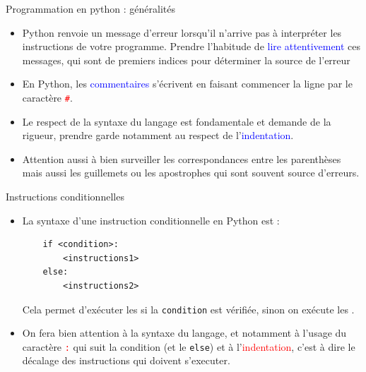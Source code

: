 \documentclass[10pt]{beamer}
\begin{document}
\begin{frame}[fragile]
	\mframe{\Python}
	\begin{block}{Programmation en python : généralités}
		\begin{itemize}
			\item<1-> Python renvoie un message d'erreur lorsqu'il n'arrive pas à interpréter les instructions de votre programme. Prendre l'habitude de \textcolor{blue}{lire attentivement} ces messages, qui sont de premiers indices pour déterminer la source de l'erreur
			\item<2-> En Python, les \textcolor{blue}{commentaires} s'écrivent en faisant commencer la ligne par le caractère \textcolor{red}{\tt \#}.
			\item<3-> Le respect de la syntaxe du langage est fondamentale et demande de la rigueur, prendre garde notamment au respect de l'\textcolor{blue}{indentation}.
			\item<4-> Attention aussi à bien surveiller les correspondances entre les parenthèses mais aussi les guillemets ou les apostrophes qui sont souvent source d'erreurs.
		\end{itemize}
	\end{block}
\end{frame}



\begin{frame}[fragile]
	\mframe{\Python}
	\begin{alertblock}{Instructions conditionnelles}
		\begin{itemize}
			\item<2-> La syntaxe d'une instruction conditionnelle en Python est :
			      \begin{lstlisting}
	if <condition>:
		<instructions1>
	else:
		<instructions2>
	\end{lstlisting}
			      Cela permet d'exécuter les {\tt <instructions1>} si la {\tt condition} est vérifiée, sinon on exécute les {\tt <instructions2>}.
			\item<3->  \textcolor{red}{\danger} On fera bien attention à la syntaxe du langage, et notamment à l'usage du caractère \textcolor{red}{\tt :} qui suit la condition (et le {\tt else}) et à l'\textcolor{red}{indentation}, c'est à dire le décalage des instructions qui doivent s'executer.
		\end{itemize}
	\end{alertblock}
\end{frame}
\end{document}
